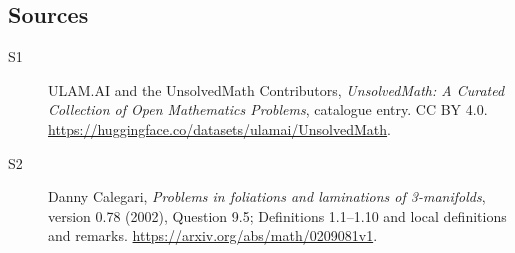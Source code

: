 \documentclass[11pt]{article}
\begin{document}
\subsection{Sources}
\begin{description}
\item[\hypertarget{source:statement:1}{S1}] ULAM.AI and the UnsolvedMath Contributors, \emph{UnsolvedMath: A Curated Collection of Open Mathematics Problems}, catalogue entry. CC BY 4.0. \url{https://huggingface.co/datasets/ulamai/UnsolvedMath}.
\item[\hypertarget{source:statement:2}{S2}] Danny Calegari, \emph{Problems in foliations and laminations of 3-manifolds}, version 0.78 (2002), Question 9.5; Definitions 1.1--1.10 and local definitions and remarks. \url{https://arxiv.org/abs/math/0209081v1}.
\end{description}
\label{end:statement}
\end{document}
